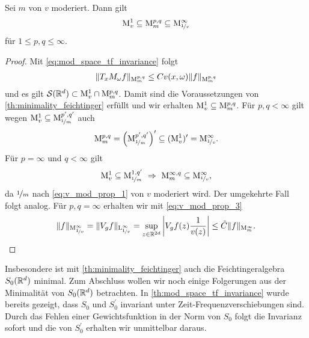 \begin{kor}
	Sei $ m $ von $ v $ moderiert.
	Dann gilt 
	\begin{align}
	\mathrm{M}^1_v 
	\subseteq
	\mathrm{M}_m^{p,q}
	\subseteq
	\mathrm{M}^\infty_{\nicefrac{1}{v}}
	\end{align}
	für $ 1 \leq p,q \leq \infty $.
\end{kor}

\begin{proof}
	Mit \eqref{eq:mod_space_tf_invariance} folgt
	\begin{align*}
	\| T_x M_\omega f \|_{\mathrm{M}_m^{p,q}}
	\leq 
	C v(x,\omega) \| f \|_{\mathrm{M}_m^{p,q}}
	\end{align*}
	und es gilt $ \mathcal{S}(\mathbb{R}^d) \subset \mathrm{M}^1_v \cap \mathrm{M}_m^{p,q} $.
	Damit sind die Voraussetzungen von \ref{th:minimality_feichtinger} erfüllt und wir erhalten $ \mathrm{M}_v^1 \subseteq \mathrm{M}_m^{p,q} $.
	Für $ p,q < \infty $ gilt wegen $ \mathrm{M}_v^1 \subseteq \mathrm{M}_{\nicefrac{1}{m}}^{p^\prime, q^\prime} $ auch
	\begin{align*}
	\mathrm{M}_{m}^{p,q} 
	= 
	\left(
	\mathrm{M}_{\nicefrac{1}{m}}^{p^\prime,q^\prime} \right)^\prime
	\subseteq 
	(\mathrm{M}_v^1)^\prime 
	=
	\mathrm{M}_{\nicefrac{1}{v}}^\infty.
	\end{align*}
	Für $ p  = \infty $ und $ q < \infty $ gilt
	\begin{align*}
	\mathrm{M}^1_v \subseteq \mathrm{M}^{1,q^\prime}_{\nicefrac{1}{m}}
	\
	\Rightarrow
	\
	\mathrm{M}^{\infty,q}_m \subseteq \mathrm{M}^\infty_{\nicefrac{1}{v}}
	,
	\end{align*}
	da $ \nicefrac{1}{m} $ nach \eqref{eq:v_mod_prop_1} von $ v $ moderiert wird. Der umgekehrte Fall folgt analog.
	Für $ p,q = \infty $ erhalten wir mit \eqref{eq:v_mod_prop_3}
	\begin{align*}
	\| f \|_{\mathrm{M}_{\nicefrac{1}{v}}^\infty}
	=
	\| V_g f \|_{\mathrm{L}^\infty_{\nicefrac{1}{v}}}
	=
	\sup \limits_{z \in \mathbb{R}^{2d}}
	\left| V_g f(z) \frac{1}{v(z)} \right|
	\leq 
	\tilde{C} \| f \|_{\mathrm{M}_m^\infty}.
	\end{align*}
\end{proof}

Insbesondere ist mit \ref{th:minimality_feichtinger} auch die Feichtingeralgebra $ S_0(\mathbb{R}^d)  $ minimal.
Zum Abschluss wollen wir noch einige Folgerungen aus der Minimalität von $ S_0(\mathbb{R}^d) $ betrachten.
In \eqref{th:mod_space_tf_invariance} wurde bereits gezeigt, dass $ S_0 $ und $ S_0^\prime  $ invariant unter Zeit-Frequenzverschiebungen sind.
Durch das Fehlen einer Gewichtsfunktion in der Norm von $ S_0 $ folgt die Invarianz sofort und die von $ S_0^\prime $ erhalten wir unmittelbar daraus.


